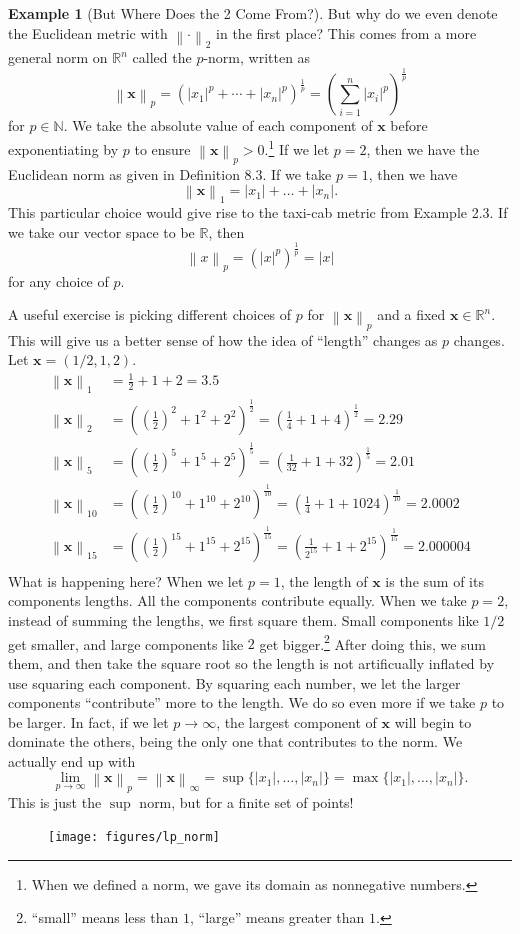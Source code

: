 \documentclass{article}
\newcommand{\N}{\mathbb{N}}
\newcommand{\R}{\mathbb{R}}
\newcommand{\x}{\mathbf{x}}
\newcommand{\norm}[1]{\left\lVert#1\right\rVert}
\theoremstyle{definition}
\newtheorem{example}{Example}[section]
\begin{document}
\begin{example}[But Where Does the 2 Come From?]
	But why do we even denote the Euclidean metric with $ \norm{\cdot}_2 $ in the first place? This comes from a more general norm on $ \R^n $ called the $ p $-norm, written as $$ \norm{\x}_p=(|x_1|^p+\cdots + |x_n|^p)^\frac{1}{p}=\left(\sum_{i=1}^n|x_i|^p\right)^\frac{1}{p}$$ for $ p\in\N $. We take the absolute value of each component of $ \x $ before exponentiating by $ p $ to ensure $ \norm{\x}_p>0 $.\footnote{When we defined a norm, we gave its domain as nonnegative numbers.} If we let $ p=2 $, then we have the Euclidean norm as given in Definition 8.3. If we take $ p=1 $, then we have $$ \norm{\x}_1=|x_1|+\ldots+|x_n|.$$ This particular choice would give rise to the taxi-cab metric from Example 2.3. If we take our vector space to be $ \R $, then $$\norm{x}_p=\left(|x|^p \right)^\frac{1}{p}=|x|$$ for any choice of $ p $.
	
	A useful exercise is picking different choices of $ p $ for $ \norm{\x}_p $ and a fixed $ \x\in\R^n $. This will give us a better sense of how the idea of ``length'' changes as $ p $ changes. Let $ \x=(1/2,1,2) $.  
	\begin{align*}
		\norm{\x}_1&=\frac{1}{2}+1+2=3.5\\
		\norm{\x}_2&=\left(\left(\frac{1}{2}\right)^2+1^2+2^2\right)^\frac{1}{2}=\left(\frac{1}{4}+1+4\right)^\frac{1}{2}=2.29\\
		\norm{\x}_5&=\left(\left(\frac{1}{2}\right)^5+1^5+2^5\right)^\frac{1}{5}=\left(\frac{1}{32}+1+32\right)^\frac{1}{5}=2.01\\
		\norm{\x}_{10}&=\left(\left(\frac{1}{2}\right)^{10}+1^{10}+2^{10}\right)^\frac{1}{{10}}=\left(\frac{1}{4}+1+1024\right)^\frac{1}{{10}}=2.0002\\
		\norm{\x}_{15}&=\left(\left(\frac{1}{2}\right)^{15}+1^{15}+2^{15}\right)^\frac{1}{{15}}=\left(\frac{1}{2^{15}}+1+2^{15}\right)^\frac{1}{{15}}=2.000004\\
	\end{align*}  
	What is happening here? When we let $ p=1 $, the length of $ \x $ is the sum of its components lengths. All the components contribute equally. When we take $ p=2 $, instead of summing the lengths, we first square them. Small components like $ 1/2 $ get smaller, and large components like $ 2 $ get bigger.\footnote{``small'' means less than $ 1 $, ``large'' means greater than $ 1 $.} After doing this, we sum them, and then take the square root so the length is not artificually inflated by use squaring each component. By squaring each number, we let the larger components ``contribute'' more to the length. We do so even more if we take $ p $ to be larger. In fact, if we let $ p\to\infty $, the largest component of $ \x $ will begin to dominate the others, being the only one that contributes to the norm. We actually end up with $$ \lim\limits_{p\to\infty}\norm{\x}_p=\norm{\x}_\infty=\sup\{|x_1|,\ldots, |x_n|\}=\max\{|x_1|,\ldots, |x_n|\}. $$ This is just the $ \sup $ norm, but for a finite set of points! 
	\begin{figure}[h!]
		\centering
		\texttt{[image: figures/lp\_norm]}
		\caption{}
		\label{fig:lpnorm}
	\end{figure}
	

\end{example}
\end{document}
